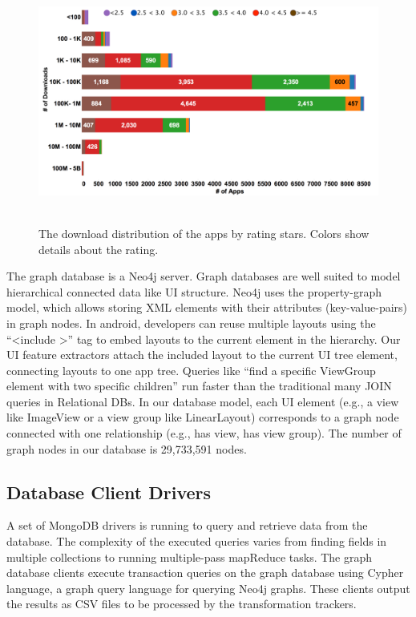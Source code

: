 \begin{figure}[!t]
	\includegraphics[width=16.5cm, height=8cm]{figures/design-pattern-changes/downloads_ratings}
	\caption{The download distribution of the apps by rating stars. Colors show details about the rating.}
	\label{fig:fig_downloads_ratings}
\end{figure}

\par
The graph database is a Neo4j server. Graph databases are well suited to model hierarchical connected data like UI structure.
Neo4j uses the property-graph model, which allows storing XML elements with their attributes (key-value-pairs) in graph nodes.
In android, developers can reuse multiple layouts using the ``\textless include \textgreater '' tag to embed layouts to the current element in the hierarchy.
Our UI feature extractors attach the included layout to the current UI tree element, connecting layouts to one app tree.
Queries like ``find a specific ViewGroup element with two specific children'' run faster than the traditional many JOIN queries in Relational DBs.
In our database model, each UI element (e.g., a view like ImageView or a view group 
like LinearLayout) corresponds to a graph node connected with one relationship (e.g., has view, has view group).
The number of graph nodes in our database is 29,733,591 nodes.

\subsection{Database Client Drivers}
A set of MongoDB drivers is running to query and retrieve data from the database.
The complexity of the executed queries varies from finding fields in multiple collections to running multiple-pass mapReduce tasks.
The graph database clients execute transaction queries on the graph database using Cypher language, a graph query language for querying Neo4j graphs.
These clients output the results as CSV files to be processed by the transformation trackers.

